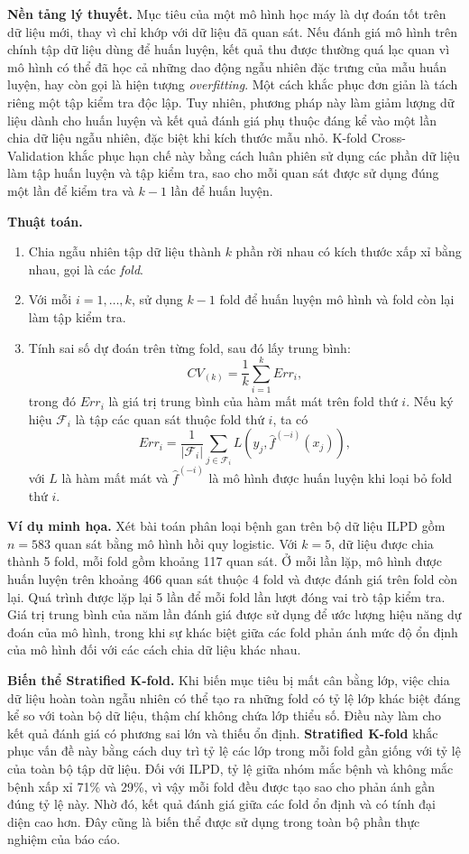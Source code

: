 \documentclass[14pt,a4paper]{extarticle}\usepackage[]{graphicx}\usepackage[]{xcolor}
\begin{document}
\textbf{Nền tảng lý thuyết.} Mục tiêu của một mô hình học máy là dự đoán tốt
trên dữ liệu mới, thay vì chỉ khớp với dữ liệu đã quan sát. Nếu đánh giá mô
hình trên chính tập dữ liệu dùng để huấn luyện, kết quả thu được thường quá
lạc quan vì mô hình có thể đã học cả những dao động ngẫu nhiên đặc trưng của
mẫu huấn luyện, hay còn gọi là hiện tượng \emph{overfitting}. Một cách khắc
phục đơn giản là tách riêng một tập kiểm tra độc lập. Tuy nhiên, phương pháp
này làm giảm lượng dữ liệu dành cho huấn luyện và kết quả đánh giá phụ thuộc
đáng kể vào một lần chia dữ liệu ngẫu nhiên, đặc biệt khi kích thước mẫu nhỏ.
K-fold Cross-Validation khắc phục hạn chế này bằng cách luân phiên sử dụng các
phần dữ liệu làm tập huấn luyện và tập kiểm tra, sao cho mỗi quan sát được sử
dụng đúng một lần để kiểm tra và $k-1$ lần để huấn luyện.

\textbf{Thuật toán.}
\begin{enumerate}
    \item Chia ngẫu nhiên tập dữ liệu thành $k$ phần rời nhau có kích thước
          xấp xỉ bằng nhau, gọi là các \emph{fold}.
    \item Với mỗi $i=1,\ldots,k$, sử dụng $k-1$ fold để huấn luyện mô hình và
          fold còn lại làm tập kiểm tra.
    \item Tính sai số dự đoán trên từng fold, sau đó lấy trung bình:
\[
CV_{(k)}
=
\frac{1}{k}\sum_{i=1}^{k}Err_i,
\]
trong đó $Err_i$ là giá trị trung bình của hàm mất mát trên fold thứ $i$.
Nếu ký hiệu $\mathcal{F}_i$ là tập các quan sát thuộc fold thứ $i$, ta có
\[
Err_i
=
\frac{1}{|\mathcal{F}_i|}
\sum_{j\in\mathcal{F}_i}
L\!\left(y_j,\hat f^{(-i)}(x_j)\right),
\]
với $L$ là hàm mất mát và $\hat f^{(-i)}$ là mô hình được huấn luyện khi loại
bỏ fold thứ $i$.
\end{enumerate}

\textbf{Ví dụ minh họa.} Xét bài toán phân loại bệnh gan trên bộ dữ liệu ILPD
gồm $n=583$ quan sát bằng mô hình hồi quy logistic. Với $k=5$, dữ liệu được
chia thành 5 fold, mỗi fold gồm khoảng 117 quan sát. Ở mỗi lần lặp, mô hình
được huấn luyện trên khoảng 466 quan sát thuộc 4 fold và được đánh giá trên
fold còn lại. Quá trình được lặp lại 5 lần để mỗi fold lần lượt đóng vai trò
tập kiểm tra. Giá trị trung bình của năm lần đánh giá được sử dụng để ước
lượng hiệu năng dự đoán của mô hình, trong khi sự khác biệt giữa các fold phản
ánh mức độ ổn định của mô hình đối với các cách chia dữ liệu khác nhau.

\textbf{Biến thể Stratified K-fold.} Khi biến mục tiêu bị mất cân bằng lớp,
việc chia dữ liệu hoàn toàn ngẫu nhiên có thể tạo ra những fold có tỷ lệ lớp
khác biệt đáng kể so với toàn bộ dữ liệu, thậm chí không chứa lớp thiểu số.
Điều này làm cho kết quả đánh giá có phương sai lớn và thiếu ổn định.
\textbf{Stratified K-fold} khắc phục vấn đề này bằng cách duy trì tỷ lệ các
lớp trong mỗi fold gần giống với tỷ lệ của toàn bộ tập dữ liệu. Đối với ILPD,
tỷ lệ giữa nhóm mắc bệnh và không mắc bệnh xấp xỉ 71\% và 29\%, vì vậy mỗi
fold đều được tạo sao cho phản ánh gần đúng tỷ lệ này. Nhờ đó, kết quả đánh
giá giữa các fold ổn định và có tính đại diện cao hơn. Đây cũng là biến thể
được sử dụng trong toàn bộ phần thực nghiệm của báo cáo.
\end{document}
